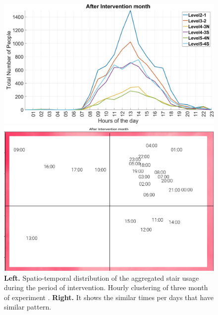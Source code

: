 \begin{figure}[htb]
    \begin{minipage}[b]{0.5\textwidth}
    \includegraphics[width=\textwidth]{image/after_int.jpg}%
    \end{minipage}
    \begin{minipage}[b]{0.39\textwidth}
    \includegraphics[width=\textwidth]{image/Chapters/Chapter6/timeseriesafter.png}
    \end{minipage}
    
    \caption{\textbf{Left.} Spatio-temporal distribution of the aggregated stair usage during the period of intervention. Hourly clustering of three month of experiment . \textbf{Right.} It shows the similar times per days that have similar pattern.}
    \label{spa1}
\end{figure}

